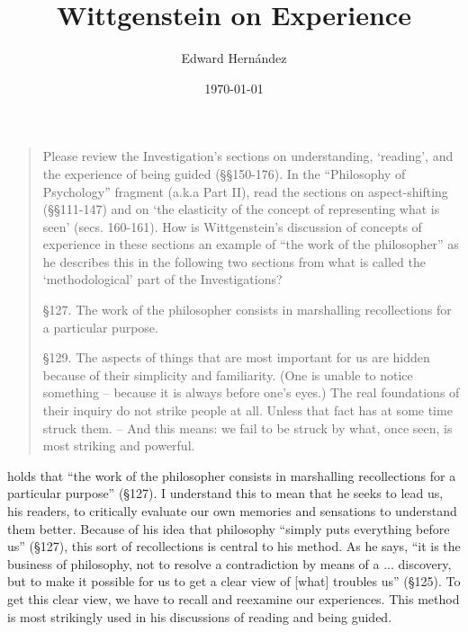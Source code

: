 \documentclass[doc,12pt,apacite,biblatex]{apa6}
\begin{document}
\title{Wittgenstein on Experience}
\author{Edward Hern\'{a}ndez}
\date{\today}

\maketitle

\vspace{-20pt}
\begin{quote}
	Please review the Investigation's sections on understanding, `reading', and
	the experience of being guided (\S\S 150-176). In the ``Philosophy of
	Psychology'' fragment (a.k.a Part II), read the sections on aspect-shifting
	(\S\S 111-147) and on `the elasticity of the concept of representing what
	is seen' (secs. 160-161).  How is Wittgenstein's discussion of concepts of
	experience in these sections an example of ``the work of the philosopher''
	as he describes this in the following two sections from what is called the
	`methodological' part of the Investigations?

	\S 127. The work of the philosopher consists in marshalling recollections
	for a particular purpose.

	\S 129. The aspects of things that are most important for us are hidden
	because of their simplicity and familiarity. (One is unable to notice
	something  -- because it is always before one's eyes.) The real foundations
	of their inquiry do not strike people at all. Unless that fact has at some
	time struck them. -- And this means: we fail to be struck by what, once
	seen, is most striking and powerful.
\end{quote}
\clearpage



 holds that ``the work of the philosopher consists in
marshalling recollections for a particular purpose'' (\S 127). I understand
this to mean that he seeks to lead us, his readers, to critically evaluate our
own memories and sensations to understand them better. Because of his idea that
philosophy ``simply puts everything before us'' (\S 127), this sort of
recollections is central to his method.  As he says, ``it is the business of
philosophy, not to resolve a contradiction by means of a ... discovery, but to
make it possible for us to get a clear view of [what] troubles us'' (\S 125).
To get this clear view, we have to recall and reexamine our experiences. This
method is most strikingly used in his discussions of reading and being guided.
\end{document}
